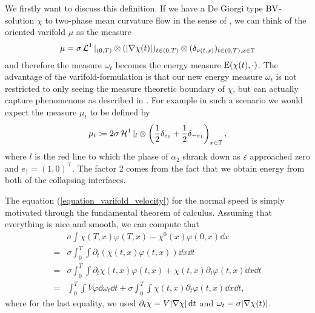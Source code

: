 We firstly want to discuss this definition. If we have a De Giorgi type $ \operatorname{BV} 
$-solution $ \chi $ to two-phase mean curvature flow in the sense of 
, we can think of 
the 
oriented varifold $ \mu $ as the measure 
\begin{equation} 
	\label{equation_simple_varifold}
	\mu =
	\sigma \operatorname{\mathcal{L}}^{ 1 } |_{ 
		( 0 , T ) } \otimes ( \abs{ \nabla \chi  ( t ) } )_{ t \in ( 0 , T ) }
	\otimes  ( \delta_{ \nu ( t , x ) } )_{ t \in ( 0 , T ), x \in \operatorname{\mathbb{T}} 
	}
\end{equation}
and therefore the measure $ \omega_{ t } $ 
becomes the energy measure $ \operatorname{E} ( \chi ( t ) , \cdot ) $.
The advantage of the varifold-formulation is that our new energy measure $ 
\omega_{ t } 
$ is not restricted to only seeing the measure theoretic boundary of $ \chi $, 
but can actually capture phenomenons as described in 
.
For example in such a scenario we would expect the measure $ \mu_{ t } $ to be 
defined by
\begin{equation}
	\label{equation_mu_in_figure}
	\mu_{ t } \coloneqq
	2 \sigma \operatorname{\mathcal{H}}^{ 1 } |_{ l } \otimes \left(  \frac{ 1 }{ 2 } \delta_{ e_{ 1 } 
	} + 
	 \frac{ 1 }{ 2 }\delta_{ -e_{ 1 } }\right)_{ x \in \operatorname{\mathbb{T}} } ,
\end{equation}
where $ l $ is the red line to which the phase 
of $ \alpha_{ 2 } $ shrank down as $ \varepsilon $ approached zero and $ e_{ 1 
} = ( 1 , 0 )^{ \top } $. The factor 
2 comes from the fact that we obtain energy from both of the collapsing 
interfaces.

The equation (\ref{equation_varifold_velocity}) for the  normal speed is simply 
motivated through 
the fundamental theorem of calculus. Assuming that everything is nice and 
smooth, we can compute that 
\begin{align*}
	&\sigma \int
	\chi ( T , x ) \varphi ( T , x ) - \chi^{ 0 } ( x ) \varphi ( 0 , x )
	\dd{ x }
	\\
	={} &
	\sigma \int_{ 0 }^{ T }
	\int
	\partial_{ t } \left(
	\chi ( t , x ) \varphi ( t , x )
	\right)
	\dd{ x }
	\dd{ t }
	\\
	={} &
	\sigma \int_{ 0 }^{ T }
	\int
	\partial_{ t } \chi ( t , x ) \varphi ( t , x )
	+
	\chi ( t , x ) \partial_{ t } \varphi ( t , x )
	\dd{ x }
	\dd{ t }
	\\
	={} &
	\int_{ 0 }^{ T }
	\int
	V \varphi 
	\dd{ \omega_{ t} }
	\dd{ t }
	+
	\sigma \int_{ 0 }^{ T }
	\int
	\chi ( t , x )
	\partial_{ t } \varphi ( t , x )
	\dd{ x }
	\dd{ t },
\end{align*}
where for the last equality, we used $ \partial_{ t } \chi = V \abs{ \nabla 
	\chi } \dd{ t } $ and $ \omega_{ t } = \sigma \abs{ \nabla \chi ( t ) } $.

